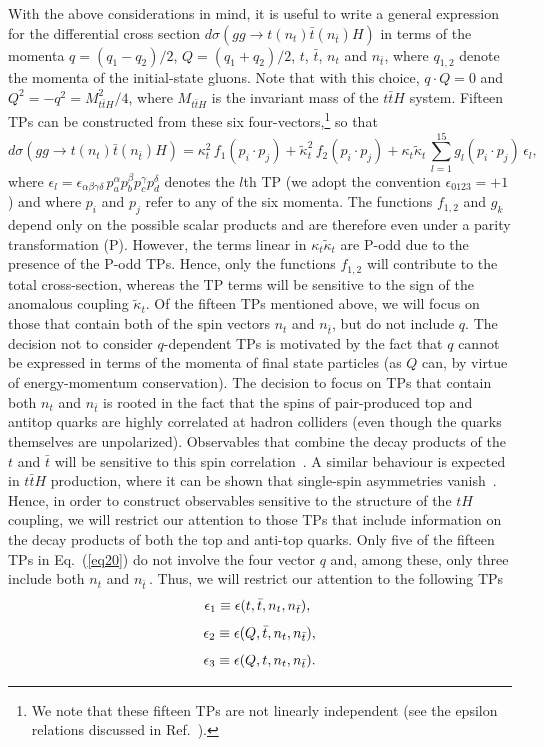 \documentclass[aps,preprint,tightenlines,floatfix,superscriptaddress,nofootinbib,showpacs]{revtex4-1}
\def\beq{\begin{equation}}
\def\eeq{\end{equation}}
\def\tbar{\bar{t}}
\def\kp{\kappa_t}
\def\kpt{\tilde{\kappa}_t}
\begin{document}
With the above considerations in mind, it is useful to
write a general expression for the differential cross
section $d\sigma(gg\to t(n_t)\tbar (n_{\tbar})H)$
in terms of the momenta $q=(q_1-q_2)/2$,
$Q=(q_1+q_2)/2$, $t$, $\bar{t}$, $n_t$ and $n_{\tbar}$, where
$q_{1,2}$ denote the momenta of the initial-state gluons. Note that with this
choice, $q\cdot Q=0$ and $Q^2=-q^2=M^2_{t\tbar H}/4$, where $M_{t\tbar
  H}$ is the invariant mass of the $t\tbar H$ system.
Fifteen TPs can be constructed from these six
four-vectors,\footnote{We note that these fifteen
  TPs are not linearly independent (see the epsilon relations
  discussed in Ref.~\cite{identities}).} so that
%
\beq
\label{eq20}
d\sigma(gg\to t(n_t)\tbar (n_{\tbar})H)= \kp^2\,f_1(p_i\cdot p_j)+\tilde{\kappa}^2_t\,f_2(p_i\cdot p_j)+\kp\kpt\,\sum^{15}_{l=1}g_l(p_i\cdot p_j)\,\epsilon_l,
\eeq   
%
where
$\epsilon_l=\epsilon_{\alpha\beta\gamma\delta}\,p^{\alpha}_ap^{\beta}_bp^{\gamma}_cp^{\delta}_d$
denotes the $l$th TP (we adopt the convention $\epsilon_{0123}=+1$) and where $p_i$ and $p_j$ refer to any of the
six momenta.  The
functions $f_{1,2}$ and $g_k$ depend only on the possible scalar
products and are therefore even under a parity transformation
($\mathrm{P}$). However, the terms linear in $\kp\kpt$ are
$\mathrm{P}$-odd due to the presence of the $\mathrm{P}$-odd
TPs. Hence, only the functions $f_{1,2}$ will contribute to the total
cross-section, whereas the TP terms will be sensitive to the sign of
the anomalous coupling $\kpt$. Of the fifteen TPs mentioned above,
we will focus on those that contain both of the spin
vectors $n_t$ and $n_{\tbar}$, but do not include $q$.
The decision not to consider $q$-dependent TPs is motivated by the fact
that $q$ cannot be expressed in terms of the momenta of final state
particles (as $Q$ can, by virtue of energy-momentum conservation). The
decision to focus on TPs that contain both $n_t$ and $n_{\tbar}$
is rooted in the fact that the spins of pair-produced top and antitop quarks
are highly correlated at hadron colliders 
(even though the quarks themselves are unpolarized).
Observables that combine the decay products of the
$t$ and $\tbar$ will be sensitive to this spin
correlation~\cite{Bernreuther}.  A similar behaviour is expected in $t\tbar H$
production, where it can be shown that single-spin asymmetries
vanish~\cite{Ellis,Biswas}. Hence, in order to construct observables
sensitive to the structure of the $tH$ coupling, we will restrict our attention
to those
TPs that include information on the decay products of both the top and
anti-top quarks. Only five of the fifteen TPs in Eq.~(\ref{eq20}) do
not involve the four vector $q$ and, among these, only three
include both $n_t$ and $n_{\tbar}\,$.  Thus, we will restrict our attention
to the following TPs
%
\beq
\label{eqa1}
\epsilon_1\equiv\epsilon(t,\tbar,n_t,n_{\tbar}),\,\,
\vspace*{1mm}
\eeq
%
\beq
\label{eqa2}
\epsilon_2\equiv\epsilon(Q,\tbar,n_t,n_{\tbar}),
\vspace*{1mm}
\eeq
%
\beq
\label{eqa3}
\epsilon_3\equiv\epsilon(Q,t,n_t,n_{\tbar}).
\vspace*{1mm}
\eeq
%
\par  
\end{document}
